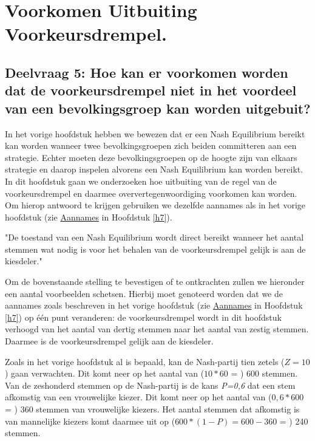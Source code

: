 \newpage
\section{Voorkomen Uitbuiting Voorkeursdrempel.}
\label{h8}

\subsection*{Deelvraag 5: Hoe kan er voorkomen worden dat de voorkeursdrempel niet in het voordeel van een bevolkingsgroep kan worden uitgebuit?}

In het vorige hoofdstuk hebben we bewezen dat er een Nash Equilibrium bereikt kan worden wanneer twee bevolkingsgroepen zich beiden committeren aan een strategie. Echter moeten deze bevolkingsgroepen op de hoogte zijn van elkaars strategie en daarop inspelen alvorens een Nash Equilibrium kan worden bereikt. In dit hoofdstuk gaan we onderzoeken hoe uitbuiting van de regel van de voorkeursdrempel en daarmee oververtegenwoordiging voorkomen kan worden. Om hierop antwoord te krijgen gebruiken we dezelfde aannames als in het vorige hoofdstuk (zie \hyperref[aannamesNash]{Aannames} in Hoofdstuk \ref{h7}). \\


\begin{theorem}
"De toestand van een Nash Equilibrium wordt direct bereikt wanneer het aantal stemmen wat nodig is voor het behalen van de voorkeursdrempel gelijk is aan de kiesdeler." \\
\end{theorem}

Om de bovenstaande stelling te bevestigen of te ontkrachten zullen we hieronder een aantal voorbeelden schetsen. Hierbij moet genoteerd worden dat we de aannames zoals beschreven in het vorige hoofdstuk (zie \hyperref[aannamesNash]{Aannames} in Hoofdstuk \ref{h7}) op één punt veranderen: de voorkeursdrempel wordt in dit hoofdstuk verhoogd van het aantal van dertig stemmen naar het aantal van zestig stemmen. Daarmee is de voorkeursdrempel gelijk aan de kiesdeler. 

Zoals in het vorige hoofdstuk al is bepaald, kan de Nash-partij tien zetels ($Z=10$) gaan verwachten. Dit komt neer op het aantal van ($10*60$ = ) 600 stemmen. Van de zeshonderd stemmen op de Nash-partij is de kans \textit{P=0,6} dat een stem afkomstig van een vrouwelijke kiezer. Dit komt neer op het aantal van ($0,6*600$ = ) 360 stemmen van vrouwelijke kiezers. Het aantal stemmen dat afkomstig is van mannelijke kiezers komt daarmee uit op ($600*(1-P)=600-360$ = ) 240 stemmen.

